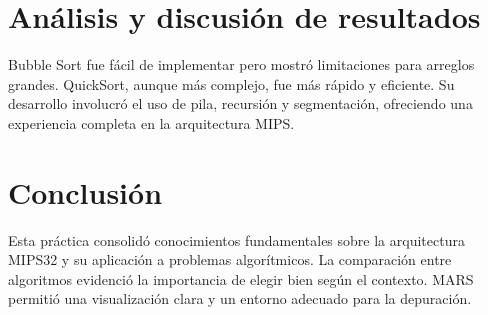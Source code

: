 \documentclass[12pt]{article}
\begin{document}
\section{Análisis y discusión de resultados}
Bubble Sort fue fácil de implementar pero mostró limitaciones para arreglos grandes. QuickSort, aunque más complejo, fue más rápido y eficiente. Su desarrollo involucró el uso de pila, recursión y segmentación, ofreciendo una experiencia completa en la arquitectura MIPS.

\section*{Conclusión}
Esta práctica consolidó conocimientos fundamentales sobre la arquitectura MIPS32 y su aplicación a problemas algorítmicos. La comparación entre algoritmos evidenció la importancia de elegir bien según el contexto. MARS permitió una visualización clara y un entorno adecuado para la depuración.
\end{document}
